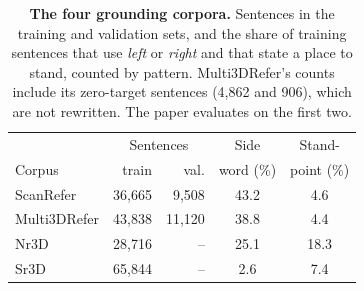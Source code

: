 \begin{table}[t]
\centering
\small
\setlength{\tabcolsep}{4.5pt}
\caption{\textbf{The four grounding corpora.} Sentences in the training and validation sets, and the share of training sentences that use \emph{left} or \emph{right} and that state a place to stand, counted by pattern. Multi3DRefer's counts include its zero-target sentences (4,862 and 906), which are not rewritten. The paper evaluates on the first two.}
\label{tab:supp_sizes}
\begin{tabular}{@{}lrrcc@{}}
\toprule
 & \multicolumn{2}{c}{Sentences} & Side & Stand- \\
Corpus & train & val. & word (\%) & point (\%) \\
\midrule
ScanRefer    & 36,665 & 9,508  & 43.2 & 4.6 \\
Multi3DRefer & 43,838 & 11,120 & 38.8 & 4.4 \\
Nr3D         & 28,716 & --     & 25.1 & 18.3 \\
Sr3D         & 65,844 & --     & 2.6  & 7.4 \\
\bottomrule
\end{tabular}
\end{table}
